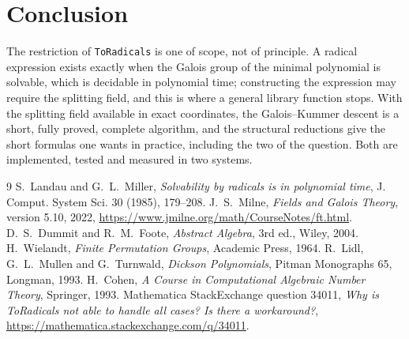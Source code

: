 \documentclass[11pt,a4paper]{article}
\theoremstyle{definition}
\theoremstyle{remark}
\newcommand{\code}[1]{\texttt{#1}}
\newcommand{\ToRadicals}{\code{ToRadicals}}
\begin{document}
\section{Conclusion}

The restriction of \ToRadicals{} is one of scope, not of principle.  A radical expression
exists exactly when the Galois group of the minimal polynomial is solvable, which is
decidable in polynomial time; constructing the expression may require the splitting
field, and this is where a general library function stops.  With the splitting field
available in exact coordinates, the Galois--Kummer descent is a short, fully proved,
complete algorithm, and the structural reductions give the short formulas one wants in
practice, including the two of the question.  Both are implemented, tested and measured
in two systems.

\begin{thebibliography}{9}
 S.~Landau and G.~L.~Miller, \emph{Solvability by radicals is in
polynomial time}, J. Comput. System Sci. 30 (1985), 179--208.
 J.~S.~Milne, \emph{Fields and Galois Theory}, version 5.10, 2022,
\url{https://www.jmilne.org/math/CourseNotes/ft.html}.
 D.~S.~Dummit and R.~M.~Foote, \emph{Abstract Algebra}, 3rd ed.,
Wiley, 2004.
 H.~Wielandt, \emph{Finite Permutation Groups}, Academic Press, 1964.
 R.~Lidl, G.~L.~Mullen and G.~Turnwald, \emph{Dickson
Polynomials}, Pitman Monographs 65, Longman, 1993.
 H.~Cohen, \emph{A Course in Computational Algebraic Number Theory},
Springer, 1993.
 Mathematica StackExchange question 34011,
\emph{Why is ToRadicals not able to handle all cases? Is there a workaround?},
\url{https://mathematica.stackexchange.com/q/34011}.
\end{thebibliography}
\end{document}
